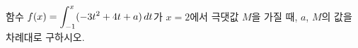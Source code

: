 함수 $f(x)=\displaystyle\int_{-1}^{x} (-3t^2+4t+a)\mkern3mu dt$가 $x=2$에서 극댓값 $M$을 가질 때, $a$, $M$의 값을 차례대로 구하시오. 
